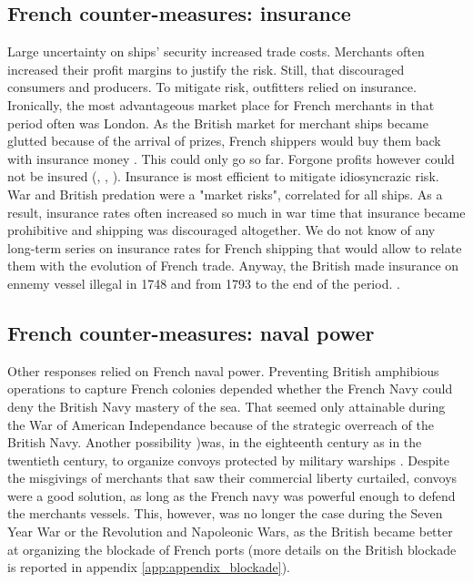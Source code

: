 \documentclass[12pt,a4paper,notitlepage,english]{article}
\begin{document}




 
 
 \subsection{French counter-measures: insurance}
 
Large uncertainty on ships’ security increased trade costs.
Merchants often increased their profit margins to justify the risk.
Still, that discouraged consumers and producers.
To mitigate risk, outfitters relied on insurance.
Ironically, the most advantageous market place for French merchants in that period often was London.
As the British market for merchant ships became glutted because of the arrival of prizes, French shippers would buy them back with insurance money \citep[p. 55]{Tracy1991}. 
This could only go so far.
Forgone profits however could not be insured (\cite[p. 160]{Ducoin1993}, \cite{Villiers1991}, \citep[p. 690-720]{Butel1973}).
Insurance is most efficient to mitigate idiosyncrazic risk.
War and British predation were a "market risks", correlated  for all ships.
As a result, insurance rates often increased so much in war time that insurance became prohibitive and shipping was discouraged altogether.
We do not know of any long-term series on insurance rates for French shipping that would allow to relate them with the evolution of French trade.
Anyway, the British made insurance on ennemy vessel illegal in 1748 and from 1793 to the end of the period. \citep[p.55]{Tracy1991}.

 \subsection{French counter-measures:  naval power}
 
Other responses relied on French naval power.
Preventing British amphibious operations to capture French colonies depended whether the French Navy could deny the British Navy mastery of the sea. 
That seemed only attainable during the War of American Independance because of the strategic overreach of the British Navy. 
Another possibility )was, in the eighteenth century as in the twentieth century, to organize convoys protected by military warships \cite[p. 393, 407, 448, 641]{Villiers1991}.
Despite the misgivings of merchants that saw their commercial liberty curtailed, convoys were a good solution, as long as the French navy was powerful enough to defend the merchants vessels.
This, however, was no longer the case during the Seven Year War or the Revolution and Napoleonic Wars, as the British became better at organizing the blockade of French ports (more details on the British blockade is reported in appendix \ref{app:appendix_blockade}).
\end{document}
